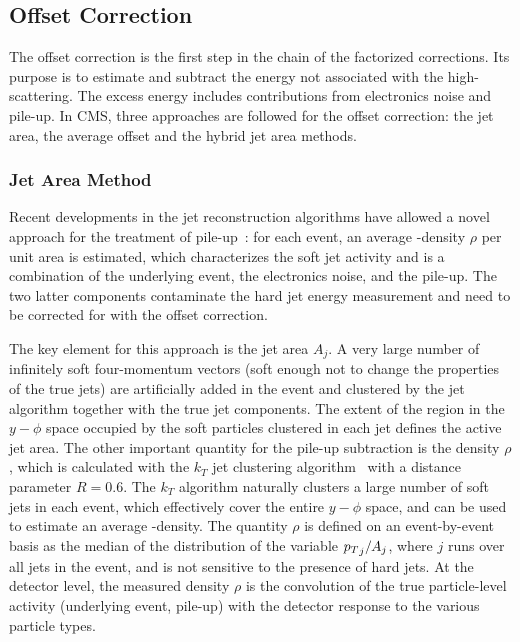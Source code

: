 \subsection{Offset Correction}\label{sec:offset}

The offset correction is the first step in the chain of the factorized corrections. Its purpose is to estimate and subtract the energy not associated with the high-\pt scattering. The excess energy includes contributions from electronics noise and pile-up. In CMS, three approaches are followed for the offset correction: the jet area, the average offset and the hybrid jet area methods.

\subsubsection{Jet Area Method}

Recent developments in the jet reconstruction algorithms have allowed a novel approach for the treatment of pile-up~\cite{PU_JET_AREAS,JET_AREAS}: for each event, an average \pt-density $\rho$ per unit area is estimated, which characterizes the soft jet activity and is a combination of the underlying event, the electronics noise, and the pile-up. The two latter components contaminate the hard jet energy measurement and need to be corrected for with the offset correction.

The key element for this approach is the jet area $A_j$. A very large number of infinitely soft four-momentum vectors (soft enough not to change the properties of the true jets) are artificially added in the event and clustered by the jet algorithm together with the true jet components. The extent of the region in the $y-\phi$ space occupied by the soft particles clustered in each jet defines the active jet area. The other important quantity for the pile-up subtraction is the \pt density $\rho$, which is calculated with the $k_T$ jet clustering algorithm~\cite{KT1,KT2,KT3} with a distance parameter $R=0.6$. The $k_T$ algorithm naturally clusters a large number of soft jets in each event, which effectively cover the entire $y-\phi$ space, and can be used to estimate an average \pt-density. The quantity $\rho$ is defined on an event-by-event basis as the median of the distribution of the variable ${p_{{T}}}_j/A_j$, where $j$ runs over all jets in the event, and is not sensitive to the presence of hard jets. At the detector level, the measured density $\rho$ is the convolution of the true particle-level activity (underlying event, pile-up) with the detector response to the various particle types.

